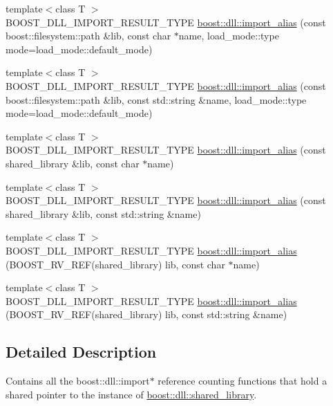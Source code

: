 \begin{DoxyCompactItemize}
\item 
{\footnotesize template$<$class T $>$ }\\B\+O\+O\+S\+T\+\_\+\+D\+L\+L\+\_\+\+I\+M\+P\+O\+R\+T\+\_\+\+R\+E\+S\+U\+L\+T\+\_\+\+T\+Y\+PE \hyperlink{a00570_a31e7946affed32f3bebb416ccca9b454}{boost\+::dll\+::import\+\_\+alias} (const boost\+::filesystem\+::path \&lib, const char $\ast$name, load\+\_\+mode\+::type mode=load\+\_\+mode\+::default\+\_\+mode)
\item 
{\footnotesize template$<$class T $>$ }\\B\+O\+O\+S\+T\+\_\+\+D\+L\+L\+\_\+\+I\+M\+P\+O\+R\+T\+\_\+\+R\+E\+S\+U\+L\+T\+\_\+\+T\+Y\+PE \hyperlink{a00570_a5ad71130573fdd290315a87d95fb92c8}{boost\+::dll\+::import\+\_\+alias} (const boost\+::filesystem\+::path \&lib, const std\+::string \&name, load\+\_\+mode\+::type mode=load\+\_\+mode\+::default\+\_\+mode)
\item 
{\footnotesize template$<$class T $>$ }\\B\+O\+O\+S\+T\+\_\+\+D\+L\+L\+\_\+\+I\+M\+P\+O\+R\+T\+\_\+\+R\+E\+S\+U\+L\+T\+\_\+\+T\+Y\+PE \hyperlink{a00570_aefeda3de57b4871b66bd42ee1199e6fe}{boost\+::dll\+::import\+\_\+alias} (const shared\+\_\+library \&lib, const char $\ast$name)
\item 
{\footnotesize template$<$class T $>$ }\\B\+O\+O\+S\+T\+\_\+\+D\+L\+L\+\_\+\+I\+M\+P\+O\+R\+T\+\_\+\+R\+E\+S\+U\+L\+T\+\_\+\+T\+Y\+PE \hyperlink{a00570_a30560963e2e72d0314053673c30b137e}{boost\+::dll\+::import\+\_\+alias} (const shared\+\_\+library \&lib, const std\+::string \&name)
\item 
{\footnotesize template$<$class T $>$ }\\B\+O\+O\+S\+T\+\_\+\+D\+L\+L\+\_\+\+I\+M\+P\+O\+R\+T\+\_\+\+R\+E\+S\+U\+L\+T\+\_\+\+T\+Y\+PE \hyperlink{a00570_ae6a8129836f1674c746a4af58c7e7104}{boost\+::dll\+::import\+\_\+alias} (B\+O\+O\+S\+T\+\_\+\+R\+V\+\_\+\+R\+EF(shared\+\_\+library) lib, const char $\ast$name)
\item 
{\footnotesize template$<$class T $>$ }\\B\+O\+O\+S\+T\+\_\+\+D\+L\+L\+\_\+\+I\+M\+P\+O\+R\+T\+\_\+\+R\+E\+S\+U\+L\+T\+\_\+\+T\+Y\+PE \hyperlink{a00570_aeafedb58798e9bf6b793f3b54ac7bcfd}{boost\+::dll\+::import\+\_\+alias} (B\+O\+O\+S\+T\+\_\+\+R\+V\+\_\+\+R\+EF(shared\+\_\+library) lib, const std\+::string \&name)
\end{DoxyCompactItemize}


\subsection{Detailed Description}
Contains all the boost\+::dll\+::import$\ast$ reference counting functions that hold a shared pointer to the instance of \hyperlink{a00271}{boost\+::dll\+::shared\+\_\+library}. 



